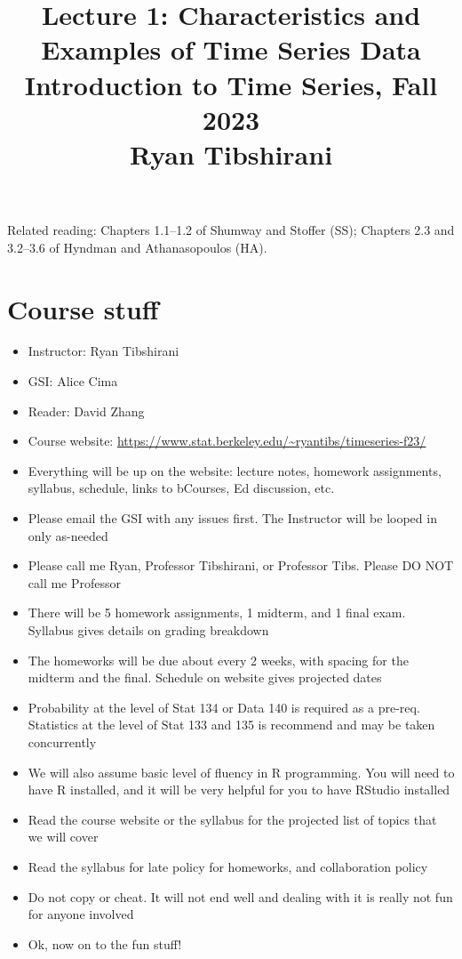 \documentclass{article}
\title{Lecture 1: Characteristics and Examples of Time Series Data \\ \smallskip  
\large Introduction to Time Series, Fall 2023 \\ \smallskip
Ryan Tibshirani}
\date{}
\begin{document}
\maketitle
\RaggedRight
\vspace{-50pt}

Related reading: Chapters 1.1--1.2 of Shumway and Stoffer (SS); Chapters 2.3 and   
3.2--3.6 of Hyndman and Athanasopoulos (HA). 

\section{Course stuff}

\begin{itemize}
\item Instructor: Ryan Tibshirani
\item GSI: Alice Cima
\item Reader: David Zhang
\item Course website:
  \url{https://www.stat.berkeley.edu/~ryantibs/timeseries-f23/}

\item Everything will be up on the website: lecture notes, homework assignments,
  syllabus, schedule, links to bCourses, Ed discussion, etc.

\item Please email the GSI with any issues first. The Instructor will be looped
  in only as-needed 

\item Please call me Ryan, Professor Tibshirani, or Professor Tibs. Please DO
  NOT call me Professor 

\item There will be 5 homework assignments, 1 midterm, and 1 final
  exam. Syllabus gives details on grading breakdown

\item The homeworks will be due about every 2 weeks, with spacing for the
  midterm and the final. Schedule on website gives projected dates

\item Probability at the level of Stat 134 or Data 140 is required as a
  pre-req. Statistics at the level of Stat 133 and 135 is recommend and may be
  taken concurrently

\item We will also assume basic level of fluency in R programming. You will need
  to have R installed, and it will be very helpful for you to have RStudio
  installed 

\item Read the course website or the syllabus for the projected list of topics
  that we will cover

\item Read the syllabus for late policy for homeworks, and collaboration policy 

\item Do not copy or cheat. It will not end well and dealing with it is really
  not fun for anyone involved

\item Ok, now on to the fun stuff!
\end{itemize}
\end{document}
